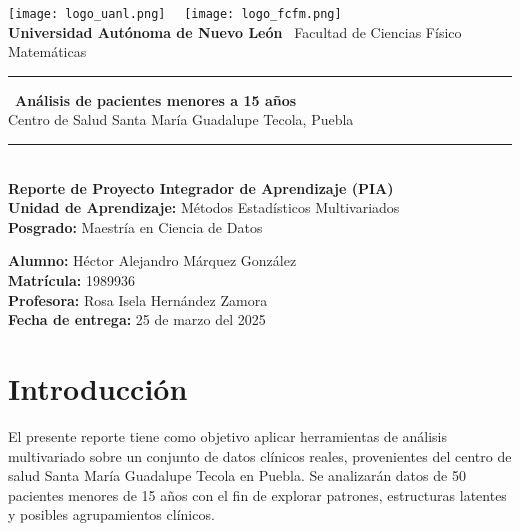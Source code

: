 \documentclass[12pt]{report}
\begin{document}
\begin{titlepage}
    \begin{center}
        \texttt{[image: logo\_uanl.png]}~\hfill~
        \texttt{[image: logo\_fcfm.png]} \\[1cm]

        {\Large \textbf{Universidad Autónoma de Nuevo León}} \
        {\large Facultad de Ciencias Físico Matemáticas} \\[1cm]

        \rule{\linewidth}{0.5mm} \
        {\LARGE \textbf{Análisis de pacientes menores a 15 años}} \\[0.4cm]
        {\large Centro de Salud Santa María Guadalupe Tecola, Puebla} \\
        \rule{\linewidth}{0.5mm} \\[1cm]

        \textbf{Reporte de Proyecto Integrador de Aprendizaje (PIA)}\\
        \textbf{Unidad de Aprendizaje:} Métodos Estadísticos Multivariados \\
        \textbf{Posgrado:} Maestría en Ciencia de Datos \\

        \vfill
        \begin{flushright}
        \textbf{Alumno:} Héctor Alejandro Márquez González\\
        \textbf{Matrícula:} 1989936\\
        \textbf{Profesora:} Rosa Isela Hernández Zamora\\
        \textbf{Fecha de entrega:} 25 de marzo del 2025
        \end{flushright}
    \end{center}
\end{titlepage}

\tableofcontents
\newpage

\chapter{Introducción}
El presente reporte tiene como objetivo aplicar herramientas de análisis multivariado sobre un conjunto de datos clínicos reales, provenientes del centro de salud Santa María Guadalupe Tecola en Puebla. Se analizarán datos de 50 pacientes menores de 15 años con el fin de explorar patrones, estructuras latentes y posibles agrupamientos clínicos.
\end{document}
